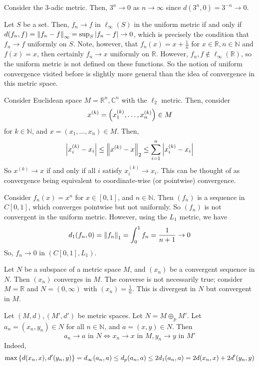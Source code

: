 \begin{example}
	Consider the \( 3 \)-adic metric.
	Then, \( 3^n \to 0 \) as \( n \to \infty \) since \( d(3^n, 0) = 3^{-n} \to 0 \).
\end{example}
\begin{example}
	Let \( S \) be a set.
	Then, \( f_n \to f \) in \( \ell_\infty(S) \) in the uniform metric if and only if \( d(f_n, f) = \norm{f_n - f}_\infty = \sup_S \abs{f_n - f} \to 0 \), which is precisely the condition that \( f_n \to f \) uniformly on \( S \).
	Note, however, that \( f_n(x) = x + \frac{1}{n} \) for \( x \in \mathbb R, n \in \mathbb N \) and \( f(x) = x \), then certainly \( f_n \to x \) uniformly on \( \mathbb R \).
	However, \( f_n, f \not\in \ell_\infty(\mathbb R) \), so the uniform metric is not defined on these functions.
	So the notion of uniform convergence visited before is slightly more general than the idea of convergence in this metric space.
\end{example}
\begin{example}
	Consider Euclidean space \( M = \mathbb R^n, \mathbb C^n \) with the \( \ell_2 \) metric.
	Then, consider
	\[
		x^{(k)} = \qty(x^{(k)}_1, \dots, x^{(k)}_n) \in M
	\]
	for \( k \in \mathbb N \), and \( x = (x_1, \dots, x_n) \in M \).
	Then,
	\[
		\abs{x^{(k)}_i - x_i} \leq \norm{x^{(k)} - x}_2 \leq \sum_{i=1}^n \abs{x^{(k)}_i - x_i}
	\]
	So \( x^{(k)} \to x \) if and only if all \( i \) satisfy \( x^{(k)}_i \to x_i \).
	This can be thought of as convergence being equivalent to coordinate-wise (or pointwise) convergence.
\end{example}
\begin{example}
	Consider \( f_n(x) = x^n \) for \( x \in [0,1] \), and \( n \in \mathbb N \).
	Then \( (f_n) \) is a sequence in \( C[0,1] \), which converges pointwise but not uniformly.
	So \( (f_n) \) is not convergent in the uniform metric.
	However, using the \( L_1 \) metric, we have
	\[
		d_1(f_n, 0) = \norm{f_n}_1 = \int_0^1 f_n = \frac{1}{n+1} \to 0
	\]
	So, \( f_n \to 0 \) in \( (C[0,1], L_1) \).
\end{example}
\begin{example}
	Let \( N \) be a subspace of a metric space \( M \), and \( (x_n) \) be a convergent sequence in \( N \).
	Then \( (x_n) \) converges in \( M \).
	The converse is not necessarily true; consider \( M = \mathbb R \) and \( N = (0, \infty) \) with \( (x_n) = \frac{1}{n} \).
	This is divergent in \( N \) but convergent in \( M \).
\end{example}
\begin{example}
	Let \( (M, d), (M', d') \) be metric spaces.
	Let \( N = M \oplus_p M' \).
	Let \( a_n = (x_n, y_n) \in N \) for all \( n \in \mathbb N \), and \( a = (x, y) \in N \).
	Then
	\[
		a_n \to a \text{ in } N \iff x_n \to x \text{ in } M, y_n \to y \text{ in } M'
	\]
	Indeed,
	\[
		\max\qty{ d(x_n, x), d'(y_n, y) } = d_\infty(a_n, a) \leq d_p(a_n, a) \leq 2 d_1(a_n, a) = 2d(x_n, x) + 2d'(y_n, y)
	\]
\end{example}

